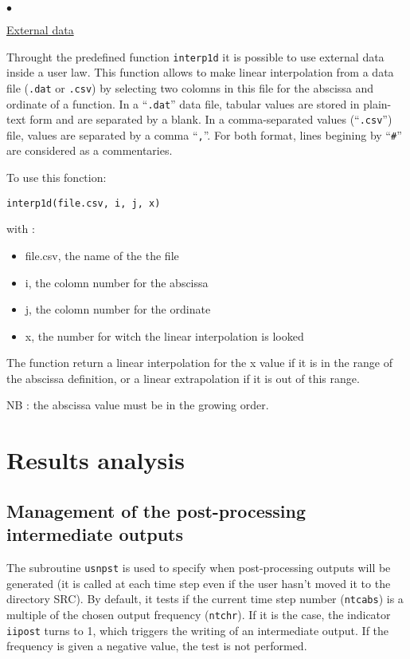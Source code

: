 {{{\begin{list}{$\bullet$}{}
\end{list}

\underline{External data}

Throught the predefined function \texttt{interp1d} it is possible to use
external data inside a user law. This function allows to make linear interpolation
from a data file (\texttt{.dat} or \texttt{.csv}) by selecting two colomns in this file
for the abscissa and ordinate of a function. In a ``\texttt{.dat}'' data file, tabular
values are stored in plain-text form and are separated by a blank. In a comma-separated values
(``\texttt{.csv}'') file, values are separated by a comma ``\texttt{,}''.
For both format, lines begining by ``\texttt{\#}'' are considered as a commentaries.

To use this fonction:

\texttt{interp1d(file.csv, i, j, x)}

with :
\begin{itemize}
\item file.csv, the name of the the file
\item i, the colomn number for the abscissa
\item j, the colomn number for the ordinate
\item x, the number for witch the linear interpolation is looked
\end{itemize}
The function return a linear interpolation for the x value
if it is in the range of the abscissa definition, or a
linear extrapolation if it is out of this range.

NB : the abscissa value must be in the growing order.

\section{Results analysis}

\subsection{Management of the post-processing intermediate outputs}

The subroutine \texttt{usnpst} is used to specify when post-processing outputs will be
generated (it is called at each time step even if the user hasn't moved it to the directory SRC). By default, it tests if the current time step number (\texttt{ntcabs}) is a
multiple of the chosen output frequency (\texttt{ntchr}). If it is the case, the
indicator \texttt{iipost} turns to 1, which triggers the writing of an
intermediate output. If the frequency is given a negative value, the
test is not performed.

}}}
